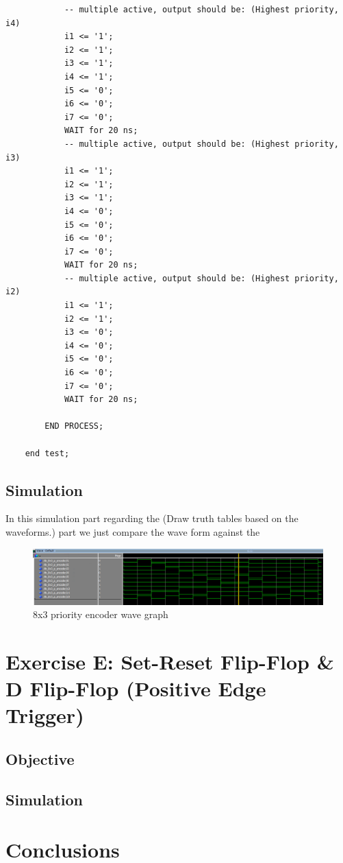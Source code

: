 \documentclass[12pt]{article}
\begin{document}
\begin{verbatim}
            -- multiple active, output should be: (Highest priority, i4)
            i1 <= '1';
            i2 <= '1';
            i3 <= '1';
            i4 <= '1';
            i5 <= '0';
            i6 <= '0';
            i7 <= '0';
            WAIT for 20 ns;
            -- multiple active, output should be: (Highest priority, i3)
            i1 <= '1';
            i2 <= '1';
            i3 <= '1';
            i4 <= '0';
            i5 <= '0';
            i6 <= '0';
            i7 <= '0';
            WAIT for 20 ns;
            -- multiple active, output should be: (Highest priority, i2)
            i1 <= '1';
            i2 <= '1';
            i3 <= '0';
            i4 <= '0';
            i5 <= '0';
            i6 <= '0';
            i7 <= '0';
            WAIT for 20 ns;
    
        END PROCESS;
    
    end test;

\end{verbatim}


\subsection{Simulation}
In this simulation part regarding the (Draw truth tables based on the waveforms.) part we just compare the wave form against the 
\begin{figure}[h]
\caption{8x3 priority encoder wave graph}
\centering
\includegraphics[width=\textwidth]{./diagrams/8x3_p_enc_simulation.png}
\end{figure}

\clearpage
\section{Exercise E: Set-Reset Flip-Flop \& D Flip-Flop (Positive Edge Trigger)}
\subsection{Objective}

\subsection{Simulation}

\section{Conclusions}
\end{document}
